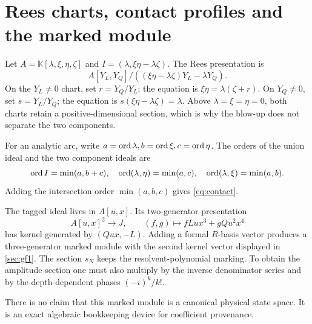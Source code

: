 \section{Rees charts, contact profiles and the marked module}\label{app:reesmarked}

Let \(A=\mathbb K[\lambda,\xi,\eta,\zeta]\) and
\(I=(\lambda,\xi\eta-\lambda\zeta)\).  The Rees presentation is
\[
A[Y_L,Y_Q]/((\xi\eta-\lambda\zeta)Y_L-\lambda Y_Q).
\]
On the \(Y_L\ne0\) chart, set \(r=Y_Q/Y_L\); the equation is
\(\xi\eta=\lambda(\zeta+r)\).  On \(Y_Q\ne0\), set \(s=Y_L/Y_Q\); the equation
is \(s(\xi\eta-\lambda\zeta)=\lambda\).  Above
\(\lambda=\xi=\eta=0\), both charts retain a positive-dimensional section,
which is why the blow-up does not separate the two components.

For an analytic arc, write
\(a=\operatorname{ord}\lambda,b=\operatorname{ord}\xi,c=\operatorname{ord}\eta\).  The orders of the union ideal and
the two component ideals are
\[
\operatorname{ord} I=\min(a,b+c),\quad
\operatorname{ord}(\lambda,\eta)=\min(a,c),\quad
\operatorname{ord}(\lambda,\xi)=\min(a,b).
\]
Adding the intersection order \(\min(a,b,c)\) gives \cref{eq:contact}.

The tagged ideal lives in \(A[u,x]\).  Its two-generator presentation
\[
A[u,x]^2\longrightarrow J,\qquad
(f,g)\longmapsto fLux^3+gQu^2x^4
\]
has kernel generated by \((Qux,-L)\).  Adding a formal \(R\)-basis vector
produces a three-generator marked module with the second kernel vector displayed
in \cref{sec:gf1}.  The section \(s_N\) keeps the resolvent-polynomial marking.
To obtain the amplitude section one must also multiply by the inverse
denominator series and by the depth-dependent phases \((-i)^k/k!\).

There is no claim that this marked module is a canonical physical state space.
It is an exact algebraic bookkeeping device for coefficient provenance.
